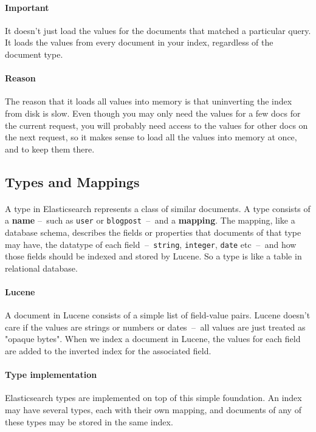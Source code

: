 \documentclass{article}%
\begin{document}
\paragraph{Important} It doesn’t just load the values for the documents that matched a particular query. It loads the values from every document in your index, regardless of the document type.

\paragraph{Reason} The reason that it loads all values into memory is that uninverting the index from disk is slow. Even though you may only need the values for a few docs for the current request, you will probably need access to the values for other docs on the next request, so it makes sense to load all the values into memory at once, and to keep them there.

\subsection{Types and Mappings}

\paragraph{} A type in Elasticsearch represents a class of similar documents. A type consists of a \textbf{name}  --  such as \texttt{user} or \texttt{blogpost}  --  and a \textbf{mapping}. The mapping, like a database schema, describes the fields or properties that documents of that type may have, the datatype of each field  --  \texttt{string}, \texttt{integer}, \texttt{date} etc  --  and how those fields should be indexed and stored by Lucene. So a type is like a table in relational database.


\paragraph{Lucene} A document in Lucene consists of a simple list of field-value pairs. Lucene doesn’t care if the values are strings or numbers or dates  --  all values are just treated as "opaque bytes". When we index a document in Lucene, the values for each field are added to the inverted index for the associated field.

\paragraph{Type implementation} Elasticsearch types are implemented on top of this simple foundation. An index may have several types, each with their own mapping, and documents of any of these types may be stored in the same index.
\end{document}
